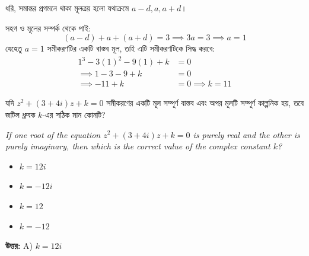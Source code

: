 \documentclass[12pt, a4paper]{article}
\begin{document}
\begin{tcolorbox}[solutionbox={সমাধান (Solution)}]
    \noindent
    ধরি, সমান্তর প্রগমনে থাকা মূলত্রয় হলো যথাক্রমে $a-d, a, a+d$। 
    
    সহগ ও মূলের সম্পর্ক থেকে পাই:
    \[ (a-d) + a + (a+d) = 3 \implies 3a = 3 \implies a = 1 \]
    যেহেতু $a = 1$ সমীকরণটির একটি বাস্তব মূল, তাই এটি সমীকরণটিকে সিদ্ধ করবে:
    \begin{align*}
        1^3 - 3(1)^2 - 9(1) + k &= 0 \\
        \implies 1 - 3 - 9 + k &= 0 \\
        \implies -11 + k &= 0 \implies k = 11
    \end{align*}
\end{tcolorbox}
\begin{tcolorbox}[questionbox={প্রশ্ন (Question) 46}]
    \noindent
    যদি $z^2 + (3+4i)z + k = 0$ সমীকরণের একটি মূল সম্পূর্ণ বাস্তব এবং অপর মূলটি সম্পূর্ণ কাল্পনিক হয়, তবে জটিল ধ্রুবক $k$-এর সঠিক মান কোনটি?
    
    \vspace{0.8em}
    \begin{english}
    \noindent\textit{\color{darkgray}
    If one root of the equation $z^2 + (3+4i)z + k = 0$ is purely real and the other is purely imaginary, then which is the correct value of the complex constant $k$?
    }
    \end{english}
\end{tcolorbox}

\begin{itemize}[label={}, leftmargin=1cm, itemsep=0.5em]
    \item[\textbf{A)}] $k = 12i$
    \item[\textbf{B)}] $k = -12i$
    \item[\textbf{C)}] $k = 12$
    \item[\textbf{D)}] $k = -12$
\end{itemize}

\vspace{0.5em}
\begin{tcolorbox}[answerbox]
    \textbf{\color{success} উত্তর:} A) $k = 12i$
\end{tcolorbox}
\vspace{1em}
\end{document}
